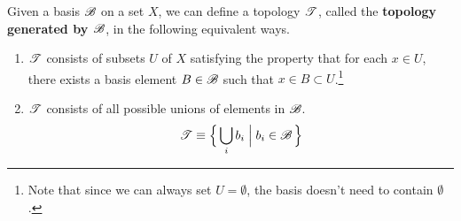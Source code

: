   \begin{theorem}
    Given a basis $\operatorname{\mathscr{B}}$ on a set $X$, we can define a topology $\operatorname{\mathscr{T}}$, called the \textbf{topology generated by $\operatorname{\mathscr{B}}$}, in the following equivalent ways. 
    \begin{enumerate}
      \item $\operatorname{\mathscr{T}}$ consists of subsets $U$ of $X$ satisfying the property that for each $x \in U$, there exists a basis element $B \in \operatorname{\mathscr{B}}$ such that $x \in B \subset U$.\footnote{Note that since we can always set $U = \emptyset$, the basis doesn't need to contain $\emptyset$. }
      \begin{center}
      \end{center}

      \item $\operatorname{\mathscr{T}}$ consists of all possible unions of elements in $\operatorname{\mathscr{B}}$. 
      \begin{equation}
        \operatorname{\mathscr{T}} \equiv \Big\{ \bigcup_i b_i \; \Big| \; b_i \in \operatorname{\mathscr{B}}\Big\}
      \end{equation}
    \end{enumerate}
  \end{theorem} 

